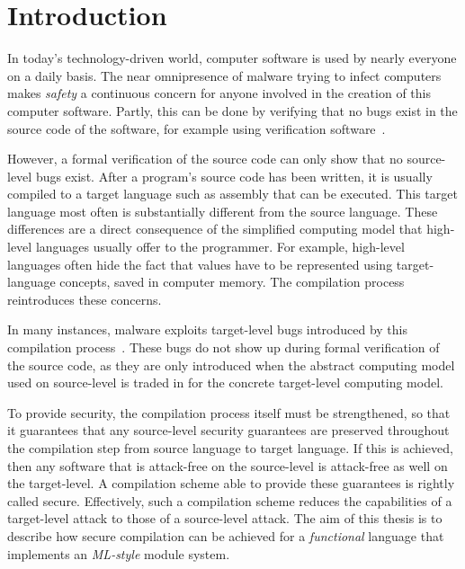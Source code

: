 \chapter{Introduction}

In today's technology-driven world, computer software is used by nearly everyone on a daily basis.
The near omnipresence of malware trying to infect computers makes \emph{safety} a continuous concern for anyone involved in the creation of this computer software.
Partly, this can be done by verifying that no bugs exist in the source code of the software, for example using verification software~\cite{Verifast:paper,Verifast:tutorial}.

However, a formal verification of the source code can only show that no source-level bugs exist.
After a program's source code has been written, it is usually compiled to a target language such as assembly that can be executed.
This target language most often is substantially different from the source language.
These differences are a direct consequence of the simplified computing model that high-level languages usually offer to the programmer.
For example, high-level languages often hide the fact that values have to be represented using target-language concepts, saved in computer memory.
The compilation process reintroduces these concerns.

In many instances, malware exploits target-level bugs introduced by this compilation process~\cite{OVSPaper,Younan:2012:RCC:2187671.2187679}.
These bugs do not show up during formal verification of the source code, as they are only introduced when the abstract computing model used on source-level is traded in for the concrete target-level computing model.

To provide security, the compilation process itself must be strengthened, so that it guarantees that any source-level security guarantees are preserved throughout the compilation step from source language to target language.
If this is achieved, then any software that is attack-free on the source-level is attack-free as well on the target-level.
A compilation scheme able to provide these guarantees is rightly called secure.
Effectively, such a compilation scheme reduces the capabilities of a target-level attack to those of a source-level attack.
The aim of this thesis is to describe how secure compilation can be achieved for a \emph{functional} language that implements an \emph{ML-style} module system.


